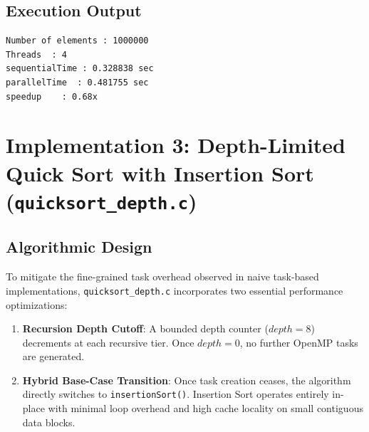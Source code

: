 \documentclass[12pt]{article}
\begin{document}
\subsection{Execution Output}
\begin{lstlisting}[style=output, caption={Console Output of \texttt{parallel\_quick\_sort.c}}]
Number of elements : 1000000
Threads  : 4
sequentialTime : 0.328838 sec
parallelTime  : 0.481755 sec
speedup    : 0.68x
\end{lstlisting}

\section{Implementation 3: Depth-Limited Quick Sort with Insertion Sort (\texttt{quicksort\_depth.c})}

\subsection{Algorithmic Design}
To mitigate the fine-grained task overhead observed in naive task-based implementations, \texttt{quicksort_depth.c} incorporates two essential performance optimizations:
\begin{enumerate}
    \item \textbf{Recursion Depth Cutoff}: A bounded depth counter ($depth = 8$) decrements at each recursive tier. Once $depth = 0$, no further OpenMP tasks are generated.
    \item \textbf{Hybrid Base-Case Transition}: Once task creation ceases, the algorithm directly switches to \texttt{insertionSort()}. Insertion Sort operates entirely in-place with minimal loop overhead and high cache locality on small contiguous data blocks.
\end{enumerate}
\end{document}
